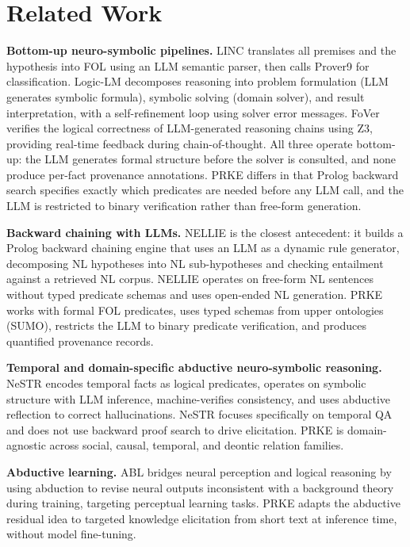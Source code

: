 \documentclass[11pt,letterpaper]{article}
\begin{document}
\section{Related Work}

\noindent\textbf{Bottom-up neuro-symbolic pipelines.}
LINC \citep{Olausson2023} translates all premises and the hypothesis into FOL using an LLM semantic parser, then calls Prover9 for classification. Logic-LM \citep{Pan2023} decomposes reasoning into problem formulation (LLM generates symbolic formula), symbolic solving (domain solver), and result interpretation, with a self-refinement loop using solver error messages. FoVer \citep{Pei2025} verifies the logical correctness of LLM-generated reasoning chains using Z3, providing real-time feedback during chain-of-thought. All three operate bottom-up: the LLM generates formal structure before the solver is consulted, and none produce per-fact provenance annotations. PRKE differs in that Prolog backward search specifies exactly which predicates are needed before any LLM call, and the LLM is restricted to binary verification rather than free-form generation.

\noindent\textbf{Backward chaining with LLMs.}
NELLIE \citep{Weir2024} is the closest antecedent: it builds a Prolog backward chaining engine that uses an LLM as a dynamic rule generator, decomposing NL hypotheses into NL sub-hypotheses and checking entailment against a retrieved NL corpus. NELLIE operates on free-form NL sentences without typed predicate schemas and uses open-ended NL generation. PRKE works with formal FOL predicates, uses typed schemas from upper ontologies (SUMO), restricts the LLM to binary predicate verification, and produces quantified provenance records.

\noindent\textbf{Temporal and domain-specific abductive neuro-symbolic reasoning.}
NeSTR \citep{Liang2025} encodes temporal facts as logical predicates, operates on symbolic structure with LLM inference, machine-verifies consistency, and uses abductive reflection to correct hallucinations. NeSTR focuses specifically on temporal QA and does not use backward proof search to drive elicitation. PRKE is domain-agnostic across social, causal, temporal, and deontic relation families.

\noindent\textbf{Abductive learning.}
ABL \citep{Zhou2019} bridges neural perception and logical reasoning by using abduction to revise neural outputs inconsistent with a background theory during training, targeting perceptual learning tasks. PRKE adapts the abductive residual idea to targeted knowledge elicitation from short text at inference time, without model fine-tuning.
\end{document}
